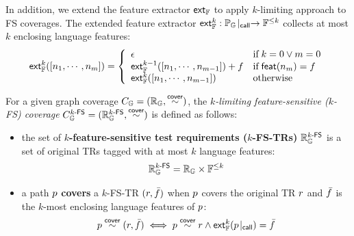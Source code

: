 In addition, we extend the feature extractor $\textsf{ext}_{\mathbb{F}}$ to apply $k$-limiting
approach to FS coverages. The extended feature extractor $\textsf{ext}_{\mathbb{F}}^{k}:
{\mathbb{P}_{\mathbb{G}}}\!\mid_{\textsf{call}} \rightarrow \mathbb{F}^{\leq k}$ collects at most $k$
enclosing language features:
%
\begin{equation}\label{equ:extfeats}
  \textsf{ext}_{\mathbb{F}}^{k}([n_1, \cdots, n_m]) = \left\{
    \begin{array}{ll}
      \epsilon & \text{if} \; k = 0 \vee m = 0\\

      \textsf{ext}_{\mathbb{F}}^{k-1}([n_1, \cdots, n_{m-1}]) + f & \text{if} \;
      \textsf{feat}(n_m) = f\\

      \textsf{ext}_{\mathbb{F}}^{k}([n_1, \cdots, n_{m-1}]) & \text{otherwise}\\
    \end{array}
  \right.
\end{equation}


\begin{definition}\label{def:k-fs-cov}
  For a given graph coverage $C_{\mathbb{G}} = (\mathbb{R}_{\mathbb{G}}, \overset{\textsf{cover}}{\sim})$, the
  \textit{$k$-limiting feature-sensitive ($k$-FS) coverage} $C_{\mathbb{G}}^{{k}\textsf{-FS}} =
  (\mathbb{R}_{\mathbb{G}}^{{k}\textsf{-FS}}, \overset{\textsf{cover}}{\sim})$ is defined as follows:
  \begin{itemize}
    \item the set of \textbf{$k$-feature-sensitive test requirements
      ($k$-FS-TRs)} $\mathbb{R}_{\mathbb{G}}^{{k}\textsf{-FS}}$ is a set of original TRs tagged with
      at most $k$ language features:
      \[
        \mathbb{R}_{\mathbb{G}}^{{k}\textsf{-FS}} = \mathbb{R}_{\mathbb{G}} \times \mathbb{F}^{\leq k}
      \]
    \item a path $p$ \textbf{covers} a $k$-FS-TR $(r, \bar{f})$ when $p$
      covers the original TR $r$ and $\bar{f}$ is the $k$-most enclosing
      language features of $p$:
      \[
        p \overset{\textsf{cover}}{\sim} (r, \bar{f}) \iff p \overset{\textsf{cover}}{\sim} r \wedge
        \textsf{ext}_{\mathbb{F}}^{k}({p}\!\mid_{\textsf{call}}) = \bar{f}
      \]
  \end{itemize}
\end{definition}


